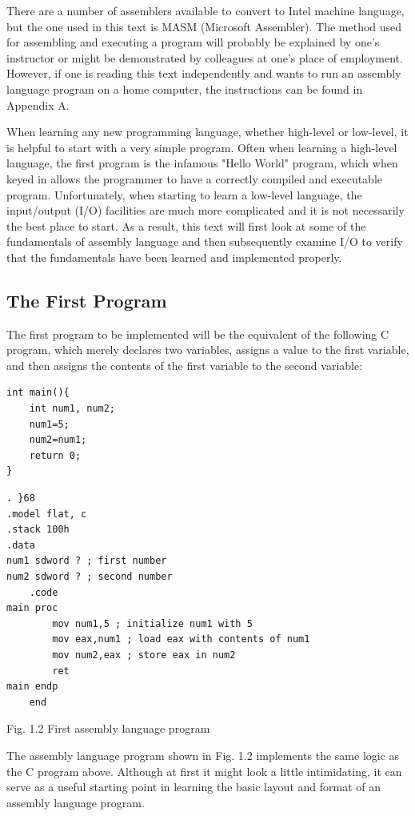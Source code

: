 \documentclass[10pt]{book}
\begin{document}
There are a number of assemblers available to convert to Intel machine language, but the one used in this text is MASM (Microsoft Assembler). The method used for assembling and executing a program will probably be explained by one's instructor or might be demonstrated by colleagues at one's place of employment. However, if one is reading this text independently and wants to run an assembly language program on a home computer, the instructions can be found in Appendix A.

When learning any new programming language, whether high-level or low-level, it is helpful to start with a very simple program. Often when learning a high-level language, the first program is the infamous "Hello World" program, which when keyed in allows the programmer to have a correctly compiled and executable program. Unfortunately, when starting to learn a low-level language, the input/output (I/O) facilities are much more complicated and it is not necessarily the best place to start. As a result, this text will first look at some of the fundamentals of assembly language and then subsequently examine I/O to verify that the fundamentals have been learned and implemented properly.

\subsection{The First Program}
The first program to be implemented will be the equivalent of the following C program, which merely declares two variables, assigns a value to the first variable, and then assigns the contents of the first variable to the second variable:

\begin{verbatim}
int main(){
    int num1, num2;
    num1=5;
    num2=num1;
    return 0;
}
\end{verbatim}

\begin{verbatim}
. }68
.model flat, c
.stack 100h
.data
num1 sdword ? ; first number
num2 sdword ? ; second number
    .code
main proc
        mov num1,5 ; initialize num1 with 5
        mov eax,num1 ; load eax with contents of num1
        mov num2,eax ; store eax in num2
        ret
main endp
    end
\end{verbatim}

Fig. 1.2 First assembly language program

The assembly language program shown in Fig. 1.2 implements the same logic as the C program above. Although at first it might look a little intimidating, it can serve as a useful starting point in learning the basic layout and format of an assembly language program.
\end{document}
